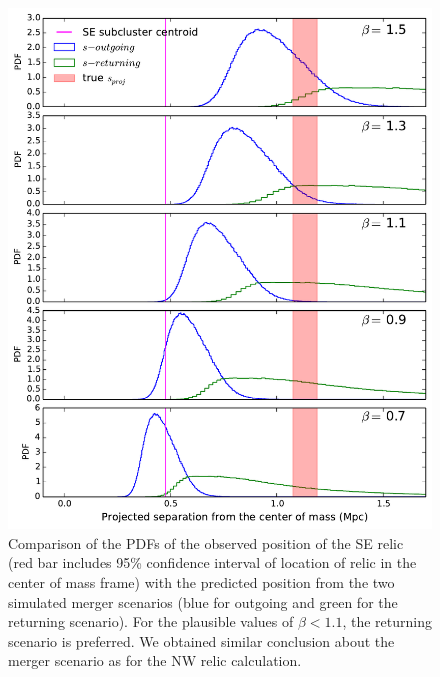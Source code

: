 \documentclass[letterpaper,useAMS,usenatbib]{mn2e}
\begin{document}
\begin{figure}
\includegraphics[width=\linewidth]{polar_prior_bounds_E.pdf}
	\caption{Comparison of the PDFs of the observed position of the SE relic (red bar
		includes 95\% confidence interval of location of relic in the center of
		mass frame) with the predicted position from the two simulated merger scenarios (blue for outgoing and green for the returning scenario). 
	For the plausible values of $\beta < 1.1$, the returning scenario is preferred. 
	We obtained similar conclusion about the merger scenario as for the NW
	relic calculation.
	\label{fig:positionprior_SE}}
\end{figure}
\end{document}
